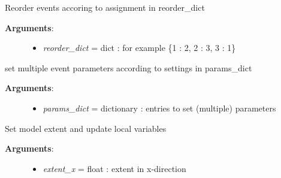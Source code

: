 \documentclass[a4paper,10pt,english]{sphinxmanual}
\begin{document}
\begin{fulllineitems}
\begin{fulllineitems}
\label{pynoddy:pynoddy.history.NoddyHistory.reorder_events}
Reorder events accoring to assignment in reorder\_dict
\begin{description}
\item[{\textbf{Arguments}:}] \leavevmode\begin{itemize}
\item {} 
\emph{reorder\_dict} = dict : for example \{1 : 2, 2 : 3, 3 : 1\}

\end{itemize}

\end{description}

\end{fulllineitems}


\begin{fulllineitems}
\label{pynoddy:pynoddy.history.NoddyHistory.set_event_params}
set multiple event parameters according to settings in params\_dict
\begin{description}
\item[{\textbf{Arguments}:}] \leavevmode\begin{itemize}
\item {} 
\emph{params\_dict} = dictionary : entries to set (multiple) parameters

\end{itemize}

\end{description}

\end{fulllineitems}


\begin{fulllineitems}
\label{pynoddy:pynoddy.history.NoddyHistory.set_extent}
Set model extent and update local variables
\begin{description}
\item[{\textbf{Arguments}:}] \leavevmode\begin{itemize}
\item {} 
\emph{extent\_x} = float : extent in x-direction


\end{itemize}
\end{description}
\end{fulllineitems}
\end{fulllineitems}
\end{document}
